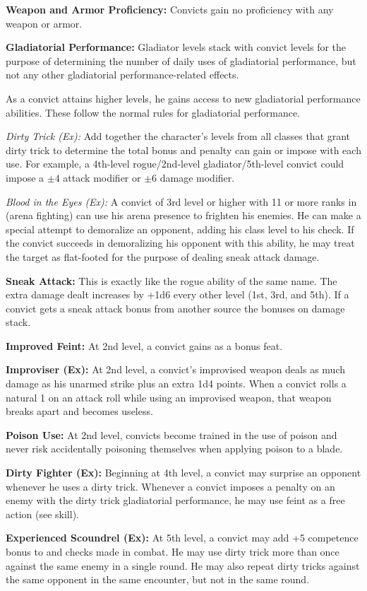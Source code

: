 {
\textbf{Weapon and Armor Proficiency:} Convicts gain no proficiency with any weapon or armor.

\textbf{Gladiatorial Performance:} Gladiator levels stack with convict levels for the purpose of determining the number of daily uses of gladiatorial performance, but not any other gladiatorial performance-related effects.

As a convict attains higher levels, he gains access to new gladiatorial performance abilities. These follow the normal rules for gladiatorial performance.

\textit{Dirty Trick (Ex):} Add together the character's levels from all classes that grant dirty trick to determine the total bonus and penalty can gain or impose with each use. For example, a 4th-level rogue/2nd-level gladiator/5th-level convict could impose a $\pm4$ attack modifier or $\pm6$ damage modifier.

\textit{Blood in the Eyes (Ex):} A convict of 3rd level or higher with 11 or more ranks in  (arena fighting) can use his arena presence to frighten his enemies. He can make a special attempt to demoralize an opponent, adding his class level to his  check. If the convict succeeds in demoralizing his opponent with this ability, he may treat the target as flat-footed for the purpose of dealing sneak attack damage.


\textbf{Sneak Attack:} This is exactly like the rogue ability of the same name. The extra damage dealt increases by +1d6 every other level (1st, 3rd, and 5th). If a convict gets a sneak attack bonus from another source the bonuses on damage stack.

\textbf{Improved Feint:} At 2nd level, a convict gains  as a bonus feat.

\textbf{Improviser (Ex):} At 2nd level, a convict's improvised weapon deals as much damage as his unarmed strike plus an extra 1d4 points. When a convict rolls a natural 1 on an attack roll while using an improvised weapon, that weapon breaks apart and becomes useless.

\textbf{Poison Use:} At 2nd level, convicts become trained in the use of poison and never risk accidentally poisoning themselves when applying poison to a blade.

\textbf{Dirty Fighter (Ex):} Beginning at 4th level, a convict may surprise an opponent whenever he uses a dirty trick. Whenever a convict imposes a penalty on an enemy with the dirty trick gladiatorial performance, he may use feint as a free action (see  skill).

\textbf{Experienced Scoundrel (Ex):} At 5th level, a convict may add +5 competence bonus to  and  checks made in combat. He may use dirty trick more than once against the same enemy in a single round. He may also repeat dirty tricks against the same opponent in the same encounter, but not in the same round.

}
